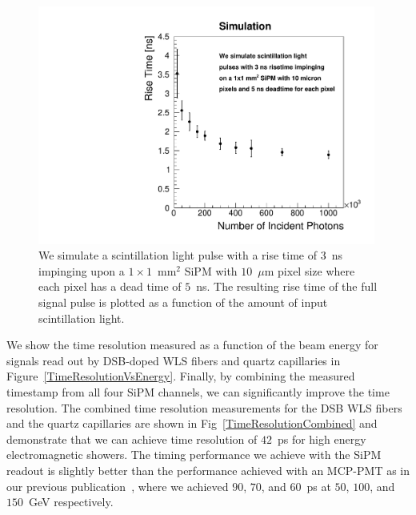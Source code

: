 \begin{figure}[!htb]
\centering
\includegraphics[width=0.99\textwidth]{figures/RisetimeSimulation.pdf}
\caption{\label{RiseTimeSimulation} We simulate a scintillation light pulse 
with a rise time of $3$~ns impinging upon a $1\times1$~$\mathrm{mm}^{2}$ 
SiPM with $10$~$\mu$m pixel size where each pixel has a dead time 
of $5$~ns. The resulting rise time of the full signal pulse is plotted as a function
of the amount of input scintillation light.}
\end{figure}

We show the time resolution measured as a function of the beam energy for
signals read out by DSB-doped WLS fibers and quartz capillaries in
Figure~\ref{TimeResolutionVsEnergy}. Finally, by combining the measured
timestamp from all four SiPM channels, we can significantly improve the time
resolution. The combined time resolution measurements for the DSB WLS fibers and
the quartz capillaries are shown in Fig~\ref{TimeResolutionCombined} and
demonstrate that we can achieve time resolution of $42$~ps for high energy
electromagnetic showers. The timing performance we achieve with the SiPM readout
is slightly better than the performance achieved with an MCP-PMT as in our
previous publication~\cite{Anderson:2015gha}, where we achieved $90$, $70$, and
$60$~ps at $50$, $100$, and $150$~GeV  respectively. 


